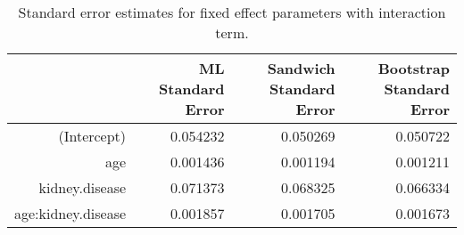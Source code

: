 \begin{table}[ht]
\centering
\begin{tabular}{rrrr}
  \toprule
 & ML Standard Error & Sandwich Standard Error & Bootstrap Standard Error \\ 
  \midrule
(Intercept) & 0.054232 & 0.050269 & 0.050722 \\ 
  age & 0.001436 & 0.001194 & 0.001211 \\ 
  kidney.disease & 0.071373 & 0.068325 & 0.066334 \\ 
  age:kidney.disease & 0.001857 & 0.001705 & 0.001673 \\ 
   \bottomrule
\end{tabular}
\caption{Standard error estimates for fixed effect parameters with interaction term.} 
\label{tab:standard_errors_interaction}
\end{table}

